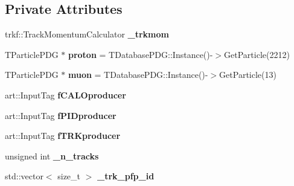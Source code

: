 \subsection*{Private Attributes}
\begin{DoxyCompactItemize}
\item 
\hypertarget{classanalysis_1_1TrackAnalysis_aa69136b70c77e0f034fe009b86ba591b}{trkf\-::\-Track\-Momentum\-Calculator {\bfseries \-\_\-trkmom}}\label{classanalysis_1_1TrackAnalysis_aa69136b70c77e0f034fe009b86ba591b}

\item 
\hypertarget{classanalysis_1_1TrackAnalysis_a4adc7f89c334ab93747a8d4c4abbcc6d}{T\-Particle\-P\-D\-G $\ast$ {\bfseries proton} = T\-Database\-P\-D\-G\-::\-Instance()-\/$>$Get\-Particle(2212)}\label{classanalysis_1_1TrackAnalysis_a4adc7f89c334ab93747a8d4c4abbcc6d}

\item 
\hypertarget{classanalysis_1_1TrackAnalysis_a0fe3b9e7864aaaa36b5f52826b4e3eb9}{T\-Particle\-P\-D\-G $\ast$ {\bfseries muon} = T\-Database\-P\-D\-G\-::\-Instance()-\/$>$Get\-Particle(13)}\label{classanalysis_1_1TrackAnalysis_a0fe3b9e7864aaaa36b5f52826b4e3eb9}

\item 
\hypertarget{classanalysis_1_1TrackAnalysis_a0ceaf940b041eda0237cc73cd330d18d}{art\-::\-Input\-Tag {\bfseries f\-C\-A\-L\-Oproducer}}\label{classanalysis_1_1TrackAnalysis_a0ceaf940b041eda0237cc73cd330d18d}

\item 
\hypertarget{classanalysis_1_1TrackAnalysis_a349dc117e508190c619cd9f47ea7647e}{art\-::\-Input\-Tag {\bfseries f\-P\-I\-Dproducer}}\label{classanalysis_1_1TrackAnalysis_a349dc117e508190c619cd9f47ea7647e}

\item 
\hypertarget{classanalysis_1_1TrackAnalysis_a45abdcf3140e68a2ce90501e33a00eb3}{art\-::\-Input\-Tag {\bfseries f\-T\-R\-Kproducer}}\label{classanalysis_1_1TrackAnalysis_a45abdcf3140e68a2ce90501e33a00eb3}

\item 
\hypertarget{classanalysis_1_1TrackAnalysis_a965f2969aac19332af4597a364586c5d}{unsigned int {\bfseries \-\_\-n\-\_\-tracks}}\label{classanalysis_1_1TrackAnalysis_a965f2969aac19332af4597a364586c5d}

\item 
\hypertarget{classanalysis_1_1TrackAnalysis_a6ff6b242cbf5345bc77a2a574218ccd9}{std\-::vector$<$ size\-\_\-t $>$ {\bfseries \-\_\-trk\-\_\-pfp\-\_\-id}}\label{classanalysis_1_1TrackAnalysis_a6ff6b242cbf5345bc77a2a574218ccd9}


\end{DoxyCompactItemize}
